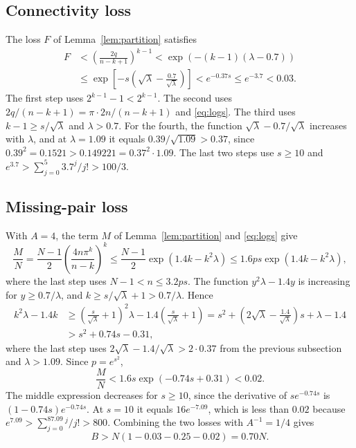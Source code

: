 \documentclass[11pt]{article}
\begin{document}
\subsection{Connectivity loss}

The loss $F$ of Lemma~\ref{lem:partition} satisfies
\begin{align*}
 F&<\left(\frac{2q}{n-k+1}\right)^{k-1}
 <\exp(-(k-1)(\lambda-0.7))\\
 &\le\exp\left[-s\left(\sqrt\lambda-\frac{0.7}{\sqrt\lambda}\right)\right]
 < e^{-0.37s}\le e^{-3.7}<0.03.
\end{align*}
The first step uses $2^{k-1}-1<2^{k-1}$. The second uses
$2q/(n-k+1)=\pi\cdot2n/(n-k+1)$ and \eqref{eq:logs}. The third uses
$k-1\ge s/\sqrt\lambda$ and $\lambda>0.7$. For the fourth, the function
$\sqrt\lambda-0.7/\sqrt\lambda$ increases with $\lambda$, and at
$\lambda=1.09$ it equals $0.39/\sqrt{1.09}>0.37$, since
$0.39^2=0.1521>0.149221=0.37^2\cdot1.09$. The last two steps use $s\ge10$ and
$e^{3.7}>\sum_{j=0}^5 3.7^j/j!>100/3$.

\subsection{Missing-pair loss}

With $A=4$, the term $M$ of Lemma~\ref{lem:partition} and \eqref{eq:logs}
give
\begin{equation*}
 \frac MN=\frac{N-1}{2}\left(\frac{4n\pi^k}{n-k}\right)^k
 \le\frac{N-1}{2}\exp(1.4k-k^2\lambda)
 \le1.6ps\exp(1.4k-k^2\lambda),
\end{equation*}
where the last step uses $N-1<n\le3.2ps$. The function $y^2\lambda-1.4y$ is
increasing for $y\ge0.7/\lambda$, and $k\ge s/\sqrt\lambda+1>0.7/\lambda$.
Hence
\begin{align*}
 k^2\lambda-1.4k
 &\ge\left(\frac{s}{\sqrt\lambda}+1\right)^2\lambda
   -1.4\left(\frac{s}{\sqrt\lambda}+1\right)
 =s^2+\left(2\sqrt\lambda-\frac{1.4}{\sqrt\lambda}\right)s
       +\lambda-1.4\\
 &>s^2+0.74s-0.31,
\end{align*}
where the last step uses
$2\sqrt\lambda-1.4/\sqrt\lambda>2\cdot0.37$ from the previous subsection and
$\lambda>1.09$. Since $p=e^{s^2}$,
\begin{equation*}
 \frac MN<1.6s\exp(-0.74s+0.31)<0.02.
\end{equation*}
The middle expression decreases for $s\ge10$, since the derivative of
$se^{-0.74s}$ is $(1-0.74s)e^{-0.74s}$. At $s=10$ it equals
$16e^{-7.09}$, which is less than $0.02$ because
$e^{7.09}>\sum_{j=0}^87.09^j/j!>800$. Combining the two losses with
$A^{-1}=1/4$ gives
\begin{equation}\label{eq:surviving}
 B>N(1-0.03-0.25-0.02)=0.70N.
\end{equation}
\end{document}
